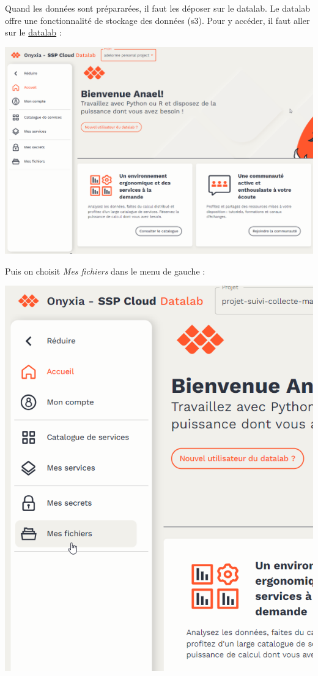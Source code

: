 \documentclass[
  letterpaper,
  DIV=11,
  numbers=noendperiod]{scrreprt}
\begin{document}
Quand les données sont prépararées, il faut les déposer sur le datalab.
Le datalab offre une fonctionnalité de stockage des données (s3). Pour y
accéder, il faut aller sur le
\href{https://datalab.sspcloud.fr/}{datalab} :

\includegraphics{./images/data_accueil_datalab.png}

Puis on choisit \emph{Mes fichiers} dans le menu de gauche :

\includegraphics{./images/data_clic_mes_fichiers.png}
\end{document}
